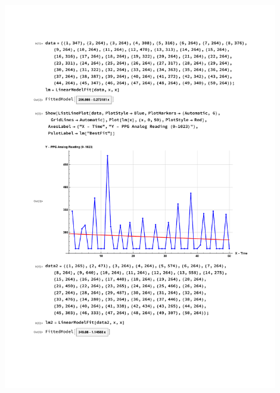 \documentclass[12pt]{article}
\begin{document}
{\newpage
\includegraphics[page=2,width=0.9\textwidth]{images/simulation1}

\newpage
}
\end{document}
